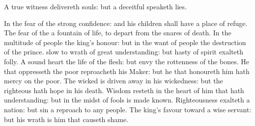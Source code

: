 {A
true
witness
delivereth
souls: but a
deceitful
{}
speaketh
lies.
\par }{\PP {}In the
fear of the
{}
{}
strong
confidence: and his
children shall have a place of
refuge.
The
fear of the
{}
{} a
fountain of
life, to
depart from the
snares of
death.
In the
multitude of
people
{} the
king’s
honour: but in the
want of
people
{} the
destruction of the
prince.
slow to
wrath
{} of
great
understanding: but
{}
hasty of
spirit
exalteth
folly.
A
sound
heart
{} the
life of the
flesh: but
envy the
rottenness of the
bones.
He that
oppresseth the
poor
reproacheth his
Maker: but he that
honoureth him hath
mercy on the
poor.
The
wicked is driven
away in his
wickedness: but the
righteous hath
hope in his
death.
Wisdom
resteth in the
heart of him that hath
understanding: but
{} in the
midst of
fools is made
known.
Righteousness
exalteth a
nation: but
sin
{} a
reproach to any
people.
The
king’s
favour
{} toward a
wise
servant: but his
wrath is
{} him that causeth
shame.

}
